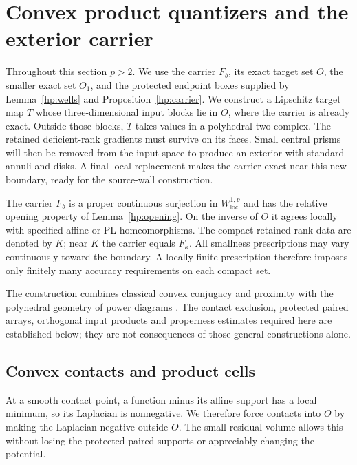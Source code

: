\section{Convex product quantizers and the exterior carrier}\label{sec:quantizers}

Throughout this section $p>2$.  We use the carrier
$F_b$, its exact target set $O$, the smaller exact set $O_1$, and the
protected endpoint boxes supplied by Lemma~\ref{hp:wells} and
Proposition~\ref{hp:carrier}.  We construct a Lipschitz target map $T$
whose three-dimensional input
blocks lie in $O$, where the carrier is already exact.  Outside those
blocks, $T$ takes values in a polyhedral two-complex.  The retained
deficient-rank gradients must survive on its faces.  Small central
prisms will then be removed from the input space to produce an exterior
with standard annuli and disks.  A final local replacement makes the
carrier exact near this new boundary, ready for the source-wall
construction.

The carrier $F_b$ is a proper continuous surjection in
$W^{1,p}_{\mathrm{loc}}$ and has the relative opening property of
Lemma~\ref{hp:opening}.  On the inverse of $O$ it agrees locally with
specified affine or PL homeomorphisms.  The compact retained rank data
are denoted by $K$; near $K$ the carrier equals $F_\kappa$.  All
smallness prescriptions may vary continuously toward the boundary.
A locally finite prescription therefore imposes only finitely many
accuracy requirements on each compact set.

The construction combines classical convex conjugacy and proximity
\cite{Moreau1965} with the polyhedral geometry of power diagrams
\cite{Aurenhammer1987}.  The contact exclusion, protected paired
arrays, orthogonal input products and properness estimates required
here are established below; they are not consequences of those
general constructions alone.

\subsection{Convex contacts and product cells}

At a smooth contact point, a function minus its affine support has a
local minimum, so its Laplacian is nonnegative.  We therefore force
contacts into $O$ by making the Laplacian negative outside $O$.  The
small residual volume allows this without losing the protected paired
supports or appreciably changing the potential.

